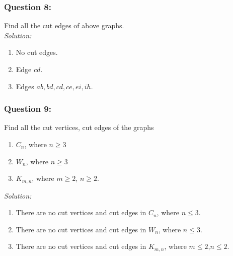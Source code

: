 \documentclass[a4paper]{article}
\begin{document}
	\subsubsection*{Question 8:}
	Find all the cut edges of above graphs. \\
	\emph{Solution:}
	\begin{enumerate}[label = \alph*)]
		\item No cut edges.
		\item Edge $cd$.
		\item Edges $ab, bd, cd , ce, ei, ih$.
	\end{enumerate}
	\subsubsection*{Question 9:}
	Find all the cut vertices, cut edges of the graphs
	\begin{enumerate}[label=\alph*)]
		\item $C_n$, where $n \geq 3$
		\item $W_n$, where $n \geq 3$
		\item $K_{m, n}$, where $m \geq 2$, $n \geq 2$.
	\end{enumerate}
	\emph{Solution:}
	\begin{enumerate}[label = \alph*)]
		\item There are no cut vertices and cut edges in $C_n$, where $n \leq 3$.
		\item There are no cut vertices and cut edges in $W_n$, where $n \leq 3$.
		\item There are no cut vertices and cut edges in $K_{m,n}$, where $m \leq 2$,$n \leq 2$.
	\end{enumerate}
\end{document}
